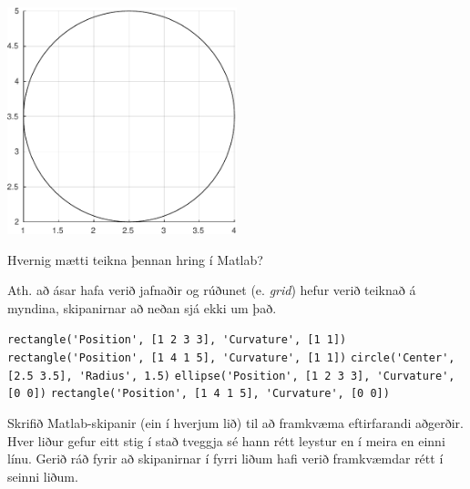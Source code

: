 \documentclass[addpoints]{exam}
\begin{document}
\begin{questions}
\begin{parts}
    \begin{center}
    \includegraphics[width=0.5\textwidth]{Pics/exam-circle}
    \end{center}

    Hvernig mætti teikna þennan hring í Matlab? 

    Ath. að ásar hafa verið jafnaðir og rúðunet (e. \emph{grid}) hefur verið teiknað á myndina, skipanirnar að neðan sjá ekki um það.

    \begin{checkboxes}
    \CorrectChoice \verb|rectangle('Position', [1 2 3 3], 'Curvature', [1 1])|
    \choice \verb|rectangle('Position', [1 4 1 5], 'Curvature', [1 1])|
    \choice \verb|circle('Center', [2.5 3.5], 'Radius', 1.5)|
    \choice \verb|ellipse('Position', [1 2 3 3], 'Curvature', [0 0])|
    \choice \verb|rectangle('Position', [1 4 1 5], 'Curvature', [0 0])|
    \end{checkboxes}
\end{parts}

\newpage

\question Skrifið Matlab-skipanir (ein í hverjum lið) til að framkvæma eftirfarandi aðgerðir. Hver liður gefur eitt stig í stað tveggja sé hann rétt leystur en í meira en einni línu. Gerið ráð fyrir að skipanirnar í fyrri liðum hafi verið framkvæmdar rétt í seinni liðum.
\end{questions}
\end{document}
